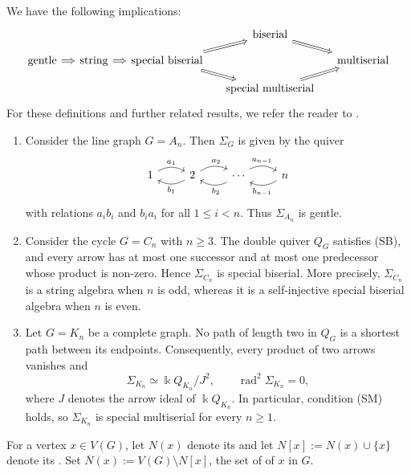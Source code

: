 \documentclass[a4paper,leqno]{amsart}
\begin{document}
We have the following implications:
$$\begin{tikzcd}[column sep=small,row sep=small]
&&& \text{biserial} \arrow[dr, Rightarrow] & \\
\text{gentle} \arrow[r, Rightarrow]
& \text{string} \arrow[r, Rightarrow]
& \text{special biserial}
  \arrow[ur, Rightarrow]
  \arrow[dr, Rightarrow]
&& \text{multiserial} \\
&&& \text{special multiserial} \arrow[ur, Rightarrow] &
\end{tikzcd}$$
For these definitions and further related results, we refer the reader to \cite{Fuller68,SW83,GS16}.

\begin{eg}\label{eg:line and cycle}
\begin{enumerate}
\item Consider the line graph $G=A_n$. Then $\Sigma_G$ is given by the quiver
$$
\begin{tikzcd}
	1 & 2 & \cdots & n
	\arrow["{a_1}", bend left, from=1-1, to=1-2]
	\arrow["{b_1}", bend left, from=1-2, to=1-1]
	\arrow["{a_2}"{pos=0.6}, bend left, from=1-2, to=1-3]
	\arrow["{b_2}"{pos=0.4}, bend left, from=1-3, to=1-2]
	\arrow["{a_{n-1}}"{pos=0.45}, bend left, from=1-3, to=1-4]
	\arrow["{b_{n-1}}"{pos=0.55}, bend left, from=1-4, to=1-3]
\end{tikzcd}
$$
with relations $a_ib_i$ and $b_ia_i$ for all $1\leq i<n$. Thus $\Sigma_{A_n}$ is gentle.

\item Consider the cycle $G=C_n$ with $n\geq3$. The double quiver
$Q_G$ satisfies (SB), and every arrow has at most one successor and at
most one predecessor whose product is non-zero. Hence $\Sigma_{C_n}$ is
special biserial. More precisely, $\Sigma_{C_n}$ is a string algebra
when $n$ is odd, whereas it is a self-injective special biserial algebra when $n$ is even.

\item Let $G=K_n$ be a complete graph. No path of length two in $Q_G$ is a shortest path between its endpoints. Consequently, every product of two arrows vanishes and
$$\Sigma_{K_n}\simeq\Bbbk Q_{K_n}/J^2,
\qquad\operatorname{rad}^2\Sigma_{K_n}=0,$$
where $J$ denotes the arrow ideal of $\Bbbk Q_{K_n}$. In particular, condition (SM) holds, so $\Sigma_{K_n}$ is special multiserial for every $n\geq1$.
\end{enumerate}
\end{eg}

For a vertex $x\in V(G)$, let $N(x)$ denote its  and let $N[x]:=N(x)\cup\{x\}$ denote its . Set $\overline N(x):=V(G)\setminus N[x]$, the set of  of $x$ in $G$.
\end{document}
